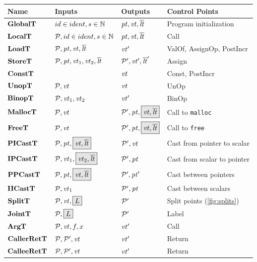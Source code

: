 \documentclass[acmsmall,review,anonymous]{acmart}\settopmatter{printfolios=true,printccs=false,printacmref=false}
\begin{document}
\begin{table}
  \begin{tabular}{|l|l|l|l|}
    \hline
    Name & Inputs & Outputs & Control Points \\
    \hline
    \(\mathbf{GlobalT}\)    & \(id \in ident, s \in \mathbb{N}\) & \(\mathit{pt},\mathit{vt},\overline{\mathit{lt}}\)    & Program initialization \\
    \(\mathbf{LocalT}\)     & \(\mathcal{P}, id \in ident, s \in \mathbb{N}\)  & \(\mathit{pt},\mathit{vt},\overline{\mathit{lt}}\)     & Call \\
    \(\mathbf{LoadT}\)      & \(\mathcal{P}, \mathit{pt}, \mathit{vt}, \overline{\mathit{lt}}\)        & \(\mathit{vt}'\)      & ValOf, AssignOp, PostIncr \\
    \(\mathbf{StoreT}\)     & \(\mathcal{P}, \mathit{pt}, \mathit{vt}_1, \mathit{vt}_2, \overline{\mathit{lt}}\)       & \(\mathcal{P}',\mathit{vt}',\overline{\mathit{lt}}'\)     & Assign \\
    \(\mathbf{ConstT}\)     &                       & \(\mathit{vt}\)     & Const, PostIncr \\
    \(\mathbf{UnopT}\)      & \(\mathcal{P}, \mathit{vt}\)        & \(\mathit{vt}\)      & UnOp \\
    \(\mathbf{BinopT}\)     & \(\mathcal{P}, \mathit{vt}_1, \mathit{vt}_2\)       & \(\mathit{vt}'\)     & BinOp \\
    \(\mathbf{MallocT}\)    & \(\mathcal{P}, \mathit{vt}\)      & \(\malloctres\)    & Call to {\tt malloc} \\
    \(\mathbf{FreeT}\)      & \(\mathcal{P}, \mathit{vt}\)        & \(\freetres\)      & Call to {\tt free} \\
    \(\mathbf{PICastT}\)    & \(\picasttargs\)      & \(\mathcal{P}',\mathit{vt}\)    & Cast from pointer to scalar \\
    \(\mathbf{IPCastT}\)    & \(\ipcasttargs\)      & \(\mathcal{P}',\mathit{pt}\)    & Cast from scalar to pointer \\
    \(\mathbf{PPCastT}\)    & \(\ppcasttargs\)      & \(\mathcal{P}',\mathit{pt}'\)    & Cast between pointers \\
    \(\mathbf{IICastT}\)    & \(\mathcal{P}, \mathit{vt}_1\)      & \(\mathcal{P}',\mathit{pt}\)    & Cast between scalars \\
    \(\mathbf{SplitT}\)     & \(\splittargs\)       & \(\mathcal{P}'\)     & Split points (\cref{fig:splits})\\
    \(\mathbf{JointT}\)      & \(\jointargs\)        & \(\mathcal{P}'\)      & Label \\
    \(\mathbf{ArgT}\)       & \(\mathcal{P}, \mathit{vt}, f, x\)         & \(\mathit{vt}'\)       & Call \\
    \(\mathbf{CallerRetT}\) & \(\mathcal{P}, \mathcal{P}', \mathit{vt}\)   & \(\mathit{vt}'\) & Return \\
    \(\mathbf{CalleeRetT}\) & \(\mathcal{P}, \mathcal{P}', \mathit{vt}\)   & \(\mathit{vt}'\) & Return \\
    \hline
  \end{tabular}

  \label{fig:controlpoints}
\end{table}
\end{document}
